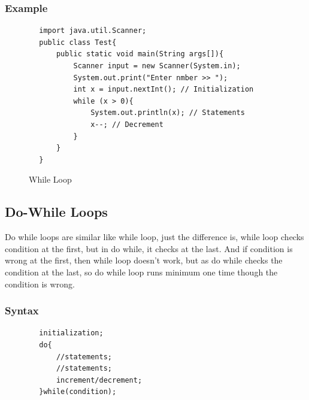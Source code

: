 \documentclass[openany]{book}  %
\begin{document}
\subsubsection{Example}
\begin{center}
    \footnotesize
    \begin{verbatim}
        import java.util.Scanner;
        public class Test{
            public static void main(String args[]){
                Scanner input = new Scanner(System.in);
                System.out.print("Enter nmber >> ");
                int x = input.nextInt(); // Initialization
                while (x > 0){
                    System.out.println(x); // Statements
                    x--; // Decrement
                }
            }
        }
    \end{verbatim}
\end{center}
% 
% 
\begin{figure}[htbp]
    \begin{center}
        \caption{While Loop\cite{Ref3}}
    \end{center}
\end{figure}

\newpage

% 
% 
\subsection{Do-While Loops}
Do while loops are similar like while loop, just the difference is, while loop checks condition at the first, but in do while, it checks at the last.
And if condition is wrong at the first, then while loop doesn't work, but as do while checks the condition at the last, so do while loop runs minimum one time
though the condition is wrong.
% 
% 
\subsubsection{Syntax}
\begin{center}
    \begin{verbatim}
        initialization;
        do{
            //statements;
            //statements;
            increment/decrement;
        }while(condition);
    \end{verbatim}
\end{center}
% 
% 
\end{document}
